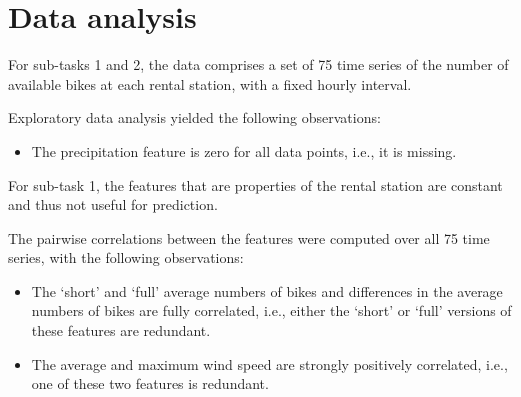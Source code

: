 \section{Data analysis}

For sub-tasks 1 and 2, the data comprises a set of 75 time series of the number
of available bikes at each rental station, with a fixed hourly interval.


Exploratory data analysis yielded the following observations:
\begin{itemize}
  \item The precipitation feature is zero for all data points, i.e., it is missing.
\end{itemize}

For sub-task 1, the features that are properties of the rental station are
constant and thus not useful for prediction.

The pairwise correlations between the features were computed over all 75
time series, with the following observations:
\begin{itemize}
  \item The `short' and `full' average numbers of bikes and differences in the
        average numbers of bikes are fully correlated, i.e., either the `short'
        or `full' versions of these features are redundant.
  \item The average and maximum wind speed are strongly positively correlated,
        i.e., one of these two features is redundant.
\end{itemize}

